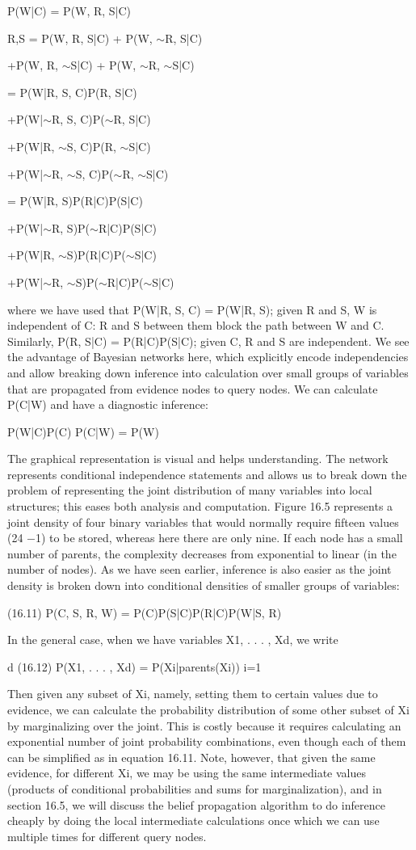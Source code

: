 P(W|C) = P(W, R, S|C)

R,S = P(W, R, S|C) + P(W, $\sim$R, S|C)

+P(W, R, $\sim$S|C) + P(W, $\sim$R, $\sim$S|C)

= P(W|R, S, C)P(R, S|C)

+P(W|$\sim$R, S, C)P($\sim$R, S|C)

+P(W|R, $\sim$S, C)P(R, $\sim$S|C)

+P(W|$\sim$R, $\sim$S, C)P($\sim$R, $\sim$S|C)

= P(W|R, S)P(R|C)P(S|C)

+P(W|$\sim$R, S)P($\sim$R|C)P(S|C)

+P(W|R, $\sim$S)P(R|C)P($\sim$S|C)

+P(W|$\sim$R, $\sim$S)P($\sim$R|C)P($\sim$S|C)

where we have used that P(W|R, S, C) = P(W|R, S); given R and S, W is independent of C: R and S between them block the path between W and C. Similarly, P(R, S|C) = P(R|C)P(S|C); given C, R and S are independent. We see the advantage of Bayesian networks here, which explicitly encode independencies and allow breaking down inference into calculation over small groups of variables that are propagated from evidence nodes to query nodes. We can calculate P(C|W) and have a diagnostic inference:

P(W|C)P(C) P(C|W) = P(W)

The graphical representation is visual and helps understanding. The network represents conditional independence statements and allows us to break down the problem of representing the joint distribution of many variables into local structures; this eases both analysis and computation. Figure 16.5 represents a joint density of four binary variables that would normally require fifteen values (24 $-$1) to be stored, whereas here there are only nine. If each node has a small number of parents, the complexity decreases from exponential to linear (in the number of nodes). As we have seen earlier, inference is also easier as the joint density is broken down into conditional densities of smaller groups of variables:

(16.11) P(C, S, R, W) = P(C)P(S|C)P(R|C)P(W|S, R)

In the general case, when we have variables X1, . . . , Xd, we write

d (16.12) P(X1, . . . , Xd) = P(Xi|parents(Xi)) i=1

Then given any subset of Xi, namely, setting them to certain values due to evidence, we can calculate the probability distribution of some other subset of Xi by marginalizing over the joint. This is costly because it requires calculating an exponential number of joint probability combinations, even though each of them can be simplified as in equation 16.11. Note, however, that given the same evidence, for different Xi, we may be using the same intermediate values (products of conditional probabilities and sums for marginalization), and in section 16.5, we will discuss the belief propagation algorithm to do inference cheaply by doing the local intermediate calculations once which we can use multiple times for different query nodes.

